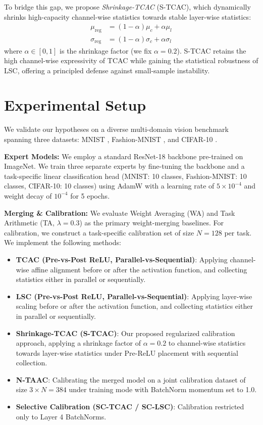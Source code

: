 \documentclass{article}
\theoremstyle{plain}
\theoremstyle{definition}
\theoremstyle{remark}
\begin{document}
To bridge this gap, we propose \textit{Shrinkage-TCAC} (S-TCAC), which dynamically shrinks high-capacity channel-wise statistics towards stable layer-wise statistics:
\begin{align}
\mu_{\text{reg}} &= (1 - \alpha) \mu_{c} + \alpha \mu_{l} \\
\sigma_{\text{reg}} &= (1 - \alpha) \sigma_{c} + \alpha \sigma_{l}
\end{align}
where $\alpha \in [0, 1]$ is the shrinkage factor (we fix $\alpha = 0.2$). S-TCAC retains the high channel-wise expressivity of TCAC while gaining the statistical robustness of LSC, offering a principled defense against small-sample instability.

\section{Experimental Setup}
\label{sec:setup}
We validate our hypotheses on a diverse multi-domain vision benchmark spanning three datasets: MNIST \cite{lecun1998mnist}, Fashion-MNIST \cite{xiao2017fashion}, and CIFAR-10 \cite{krizhevsky2009cifar}.

\textbf{Expert Models:} We employ a standard ResNet-18 backbone pre-trained on ImageNet. We train three separate experts by fine-tuning the backbone and a task-specific linear classification head (MNIST: 10 classes, Fashion-MNIST: 10 classes, CIFAR-10: 10 classes) using AdamW with a learning rate of $5 \times 10^{-4}$ and weight decay of $10^{-4}$ for 5 epochs.

\textbf{Merging \& Calibration:} We evaluate Weight Averaging (WA) and Task Arithmetic (TA, $\lambda=0.3$) as the primary weight-merging baselines. For calibration, we construct a task-specific calibration set of size $N=128$ per task. We implement the following methods:
\begin{itemize}
    \item \textbf{TCAC (Pre-vs-Post ReLU, Parallel-vs-Sequential)}: Applying channel-wise affine alignment before or after the activation function, and collecting statistics either in parallel or sequentially.
    \item \textbf{LSC (Pre-vs-Post ReLU, Parallel-vs-Sequential)}: Applying layer-wise scaling before or after the activation function, and collecting statistics either in parallel or sequentially.
    \item \textbf{Shrinkage-TCAC (S-TCAC)}: Our proposed regularized calibration approach, applying a shrinkage factor of $\alpha=0.2$ to channel-wise statistics towards layer-wise statistics under Pre-ReLU placement with sequential collection.
    \item \textbf{N-TAAC}: Calibrating the merged model on a joint calibration dataset of size $3 \times N = 384$ under training mode with BatchNorm momentum set to 1.0.
    \item \textbf{Selective Calibration (SC-TCAC / SC-LSC)}: Calibration restricted only to Layer 4 BatchNorms.
\end{itemize}
\end{document}
